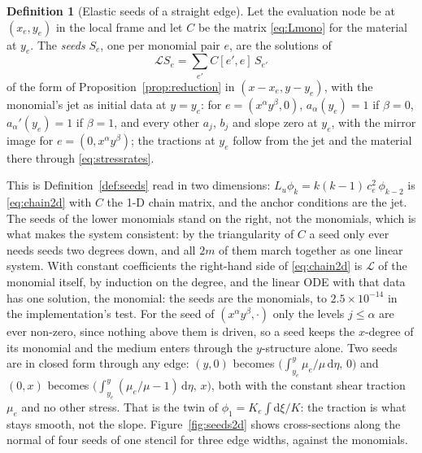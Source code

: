 \documentclass[11pt]{amsart}
\theoremstyle{definition}
\newtheorem{definition}[theorem]{Definition}
\theoremstyle{remark}
\newcommand{\Lu}{L_u}
\begin{document}
\begin{definition}[Elastic seeds of a straight edge]
\label{def:seeds2d}
Let the evaluation node be at $(x_e, y_e)$ in the local frame and let
$C$ be the matrix \eqref{eq:Lmono} for the material at $y_e$. The
\emph{seeds} $S_e$, one per monomial pair $e$, are the solutions of
\begin{equation}
  \label{eq:chain2d}
  \mathcal{L} S_e = \sum_{e'} C[e', e]\, S_{e'}
\end{equation}
of the form of Proposition~\ref{prop:reduction} in $(x - x_e, y - y_e)$,
with the monomial's jet as initial data at $y = y_e$: for $e = (x^\alpha
y^\beta, 0)$, $a_\alpha(y_e) = 1$ if $\beta = 0$, $a_\alpha'(y_e) = 1$ if
$\beta = 1$, and every other $a_j$, $b_j$ and slope zero at $y_e$, with
the mirror image for $e = (0, x^\alpha y^\beta)$; the tractions at $y_e$
follow from the jet and the material there through
\eqref{eq:stressrates}.
\end{definition}

This is Definition~\ref{def:seeds} read in two dimensions: $\Lu \phi_k
= k (k - 1)\, c_e^2\, \phi_{k-2}$ is \eqref{eq:chain2d} with $C$ the
1-D chain matrix, and the anchor conditions are the jet. The seeds of
the lower monomials stand on the right, not the monomials, which is what
makes the system consistent: by the triangularity of $C$ a seed only
ever needs seeds two degrees down, and all $2m$ of them march together
as one linear system. With constant coefficients the right-hand side of
\eqref{eq:chain2d} is $\mathcal{L}$ of the monomial itself, by induction
on the degree, and the linear ODE with that data has one solution, the
monomial: the seeds are the monomials, to $2.5 \times 10^{-14}$ in the
implementation's test. For the seed of $(x^\alpha y^\beta, \cdot)$ only
the levels $j \le \alpha$ are ever non-zero, since nothing above them is
driven, so a seed keeps the $x$-degree of its monomial and the medium
enters through the $y$-structure alone. Two seeds are in closed form
through any edge: $(y, 0)$ becomes $\bigl( \int_{y_e}^{y} \mu_e / \mu
\, \mathrm{d}\eta,\, 0 \bigr)$ and $(0, x)$ becomes $\bigl(
\int_{y_e}^{y} (\mu_e / \mu - 1)\, \mathrm{d}\eta,\, x \bigr)$, both with
the constant shear traction $\mu_e$ and no other stress. That is the
twin of $\phi_1 = K_e \int \mathrm{d}\xi / K$: the traction is what stays
smooth, not the slope. Figure~\ref{fig:seeds2d} shows cross-sections along the
normal of four seeds of one stencil for three edge widths, against the
monomials.
\end{document}
